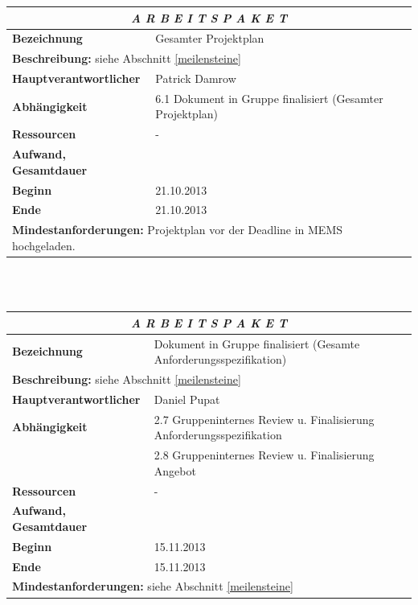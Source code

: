 \documentclass[fontsize=12pt,paper=a4,twoside]{scrartcl}
\begin{document}
\begin{tabular}{p{7.5cm}|p{7.5cm}}\toprule
\multicolumn{2}{c}{\textbf{\textit{A R B E I T S P A K E T \quad 6.2}}} \\ \toprule \hline
\textbf{Bezeichnung} & Gesamter Projektplan\\\hline
\multicolumn{2}{p{15cm}}{\textbf{Beschreibung:} \newline 
siehe Abschnitt \ref{meilensteine} }  \\\hline
\textbf{Hauptverantwortlicher} & Patrick Damrow \\\hline
\textbf{Abhängigkeit} & 6.1 Dokument in Gruppe finalisiert (Gesamter Projektplan)\\\hline
\textbf{Ressourcen} & -\\\hline
\textbf{Aufwand, Gesamtdauer} & \\\hline
\textbf{Beginn} & 21.10.2013 \\\hline
\textbf{Ende} & 21.10.2013\\\hline
\multicolumn{2}{p{15cm}}{\textbf{Mindestanforderungen: } \newline
Projektplan vor der Deadline in MEMS hochgeladen.}  \\ \toprule
\end{tabular} \\\\

\begin{tabular}{p{7.5cm}|p{7.5cm}}\toprule
\multicolumn{2}{c}{\textbf{\textit{A R B E I T S P A K E T \quad 6.3}}} \\ \toprule \hline
\textbf{Bezeichnung} & Dokument in Gruppe finalisiert (Gesamte Anforderungsspezifikation)\\\hline
\multicolumn{2}{p{15cm}}{\textbf{Beschreibung:} \newline 
siehe Abschnitt \ref{meilensteine} }  \\\hline
\textbf{Hauptverantwortlicher} & Daniel Pupat \\\hline
\textbf{Abhängigkeit} & 2.7 Gruppeninternes Review u. Finalisierung Anforderungsspezifikation \\
& 2.8 Gruppeninternes Review u. Finalisierung Angebot\\\hline
\textbf{Ressourcen} & -\\\hline
\textbf{Aufwand, Gesamtdauer} & \\\hline
\textbf{Beginn} & 15.11.2013 \\\hline
\textbf{Ende} & 15.11.2013\\\hline
\multicolumn{2}{p{15cm}}{\textbf{Mindestanforderungen: } \newline
siehe Abschnitt \ref{meilensteine}}  \\ \toprule
\end{tabular} \\\\
\end{document}
